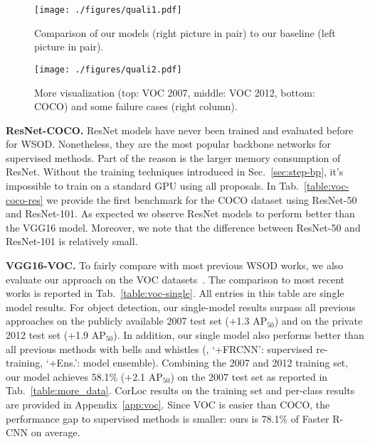 \documentclass[10pt,twocolumn,letterpaper]{article}
\begin{document}
\begin{figure*}[h]
\vspace{-1em}
\centering
\texttt{[image: ./figures/quali1.pdf]}
\vspace{-0.93em}
\caption{Comparison of our models (right picture in pair) to our  baseline (left picture in pair).}
\label{fig:quali1}
\vspace{0.2em}
\texttt{[image: ./figures/quali2.pdf]}
\vspace{-0.93em}
\caption{More visualization (top: VOC 2007, middle: VOC 2012, bottom: COCO) and some failure cases (right column).}
\label{fig:quali2}
\vspace{-1.0em}
\end{figure*}


\noindent\textbf{ResNet-COCO.} ResNet models have never been trained and evaluated before for WSOD. Nonetheless, they are the most popular backbone networks for supervised methods. Part of the reason is the larger memory consumption of ResNet. Without the training techniques introduced in Sec.~\ref{sec:step-bp}, it's impossible to train  on a standard GPU using all proposals. In Tab.~\ref{table:voc-coco-res} we provide the first benchmark for the COCO dataset using ResNet-50 and ResNet-101. As expected we observe ResNet models to perform better than the VGG16 model. Moreover, we note that the difference between ResNet-50 and ResNet-101 is relatively small. 

\noindent\textbf{VGG16-VOC.}
To fairly compare with most previous WSOD works, we also evaluate our approach on the VOC datasets~\cite{pascal}. The comparison to  most recent works is reported in Tab.~\ref{table:voc-single}. All entries in this table are single model results. For object detection, our single-model results surpass all previous approaches on the publicly available 2007 test set (+1.3 AP$_{50}$) and on the private 2012 test set (+1.9 AP$_{50}$). In addition, our single model also performs better than all  previous methods with bells and whistles (\eg, `+FRCNN': supervised re-training, `+Ens.': model ensemble). Combining the 2007 and 2012  training set, our model  achieves 58.1\% (+2.1 AP$_{50}$) on the 2007 test set as reported in Tab.~\ref{table:more_data}. CorLoc results on the training set and  per-class results are provided in Appendix~\ref{app:voc}. Since VOC is  easier than COCO, the  performance gap to supervised methods is smaller: ours is 78.1\% of Faster R-CNN on average. 
\end{document}
